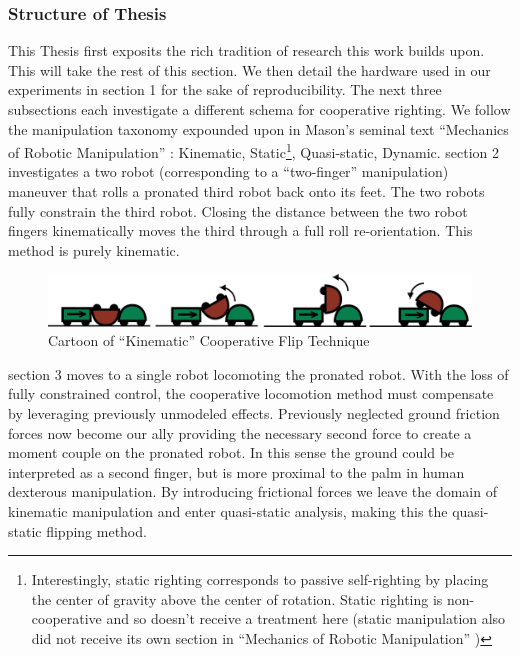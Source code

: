 \documentclass[letterpaper, 10 pt, conference]{ieeeconf}
\begin{document}
\subsubsection{Structure of Thesis}
This Thesis first exposits the rich tradition of research this work builds upon. This will take the rest of this section.
We then detail the hardware used in our experiments in section 1 for the sake of reproducibility.
The next three subsections each investigate a different schema for cooperative righting.
We follow the manipulation taxonomy expounded upon in Mason's seminal text ``Mechanics of Robotic Manipulation'' \cite{MasonMORMBook}: Kinematic, Static\footnote{Interestingly, static righting corresponds to passive self-righting by placing the center of gravity above the center of rotation. Static righting is non-cooperative and so doesn't receive a treatment here (static manipulation also did not receive its own section in ``Mechanics of Robotic Manipulation'' \cite{MasonMORMBook})}, Quasi-static, Dynamic.
section 2 investigates a two robot (corresponding to a ``two-finger'' manipulation) maneuver that rolls a pronated third robot back onto its feet.
The two robots fully constrain the third robot. Closing the distance between the two robot fingers kinematically moves the third through a full roll re-orientation.
This method is purely kinematic.

\begin{figure}[ht]
\centering
\includegraphics[width=1.0\columnwidth]{Kinematic_CoopCartoon.png}
\caption{Cartoon of ``Kinematic'' Cooperative Flip Technique}
\end{figure}

section 3 moves to a single robot locomoting the pronated robot. With the loss of fully constrained control, the cooperative locomotion method must compensate by leveraging previously unmodeled effects.
Previously neglected ground friction forces now become our ally providing the necessary second force to create a moment couple on the pronated robot.
In this sense the ground could be interpreted as a second finger, but is more proximal to the palm in human dexterous manipulation.
By introducing frictional forces we leave the domain of kinematic manipulation and enter quasi-static analysis, making this the quasi-static flipping method.
\end{document}
